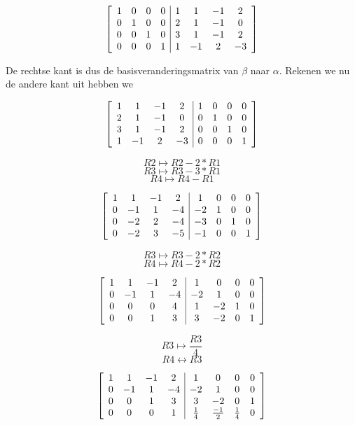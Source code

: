 \documentclass[lineaire_algebra_oplossingen.tex]{subfiles}
\begin{document}
\[
\left[
\begin{array}{ c c c c | c c c c }
1 & 0 & 0 & 0 & 1 & 1 & -1 & 2\\
0 & 1 & 0 & 0 & 2 & 1 & -1 & 0\\
0 & 0 & 1 & 0 & 3 & 1 & -1 & 2\\
0 & 0 & 0 & 1 & 1 & -1 & 2 & -3
\end{array}
\right]
\]

De rechtse kant is dus de basisveranderingsmatrix van $\beta$ naar $\alpha$. Rekenen we nu de andere kant uit hebben we

\[
\left[
\begin{array}{ c c c c | c c c c }
1 & 1 & -1 & 2 & 1 & 0 & 0 & 0\\
2 & 1 & -1 & 0 & 0 & 1 & 0 & 0\\
3 & 1 & -1 & 2 & 0 & 0 & 1 & 0\\
1 & -1 & 2 & -3 & 0 & 0 & 0 & 1
\end{array}
\right]
\]

\[R2 \mapsto R2 - 2*R1 \]
\[R3 \mapsto R3 - 3*R1 \]
\[R4 \mapsto R4 - R1 \]

\[
\left[
\begin{array}{ c c c c | c c c c }
1 & 1 & -1 & 2 & 1 & 0 & 0 & 0\\
0 & -1 & 1 & -4 & -2 & 1 & 0 & 0\\
0 & -2 & 2 & -4 & -3 & 0 & 1 & 0\\
0 & -2 & 3 & -5 & -1 & 0 & 0 & 1
\end{array}
\right]
\]

\[R3 \mapsto R3 - 2*R2 \]
\[R4 \mapsto R4 - 2*R2 \]

\[
\left[
\begin{array}{ c c c c | c c c c }
1 & 1 & -1 & 2 & 1 & 0 & 0 & 0\\
0 & -1 & 1 & -4 & -2 & 1 & 0 & 0\\
0 & 0 & 0 & 4 & 1 & -2 & 1 & 0\\
0 & 0 & 1 & 3 & 3 & -2 & 0 & 1
\end{array}
\right]
\]

\[R3 \mapsto \frac{R3}{4} \]
\[R4 \leftrightarrow R3 \]

\[
\left[
\begin{array}{ c c c c | c c c c }
1 & 1 & -1 & 2 & 1 & 0 & 0 & 0\\
0 & -1 & 1 & -4 & -2 & 1 & 0 & 0\\
0 & 0 & 1 & 3 & 3 & -2 & 0 & 1\\
0 & 0 & 0 & 1 & \frac{1}{4} & \frac{-1}{2} & \frac{1}{4} & 0
\end{array}
\right]
\]
\end{document}
